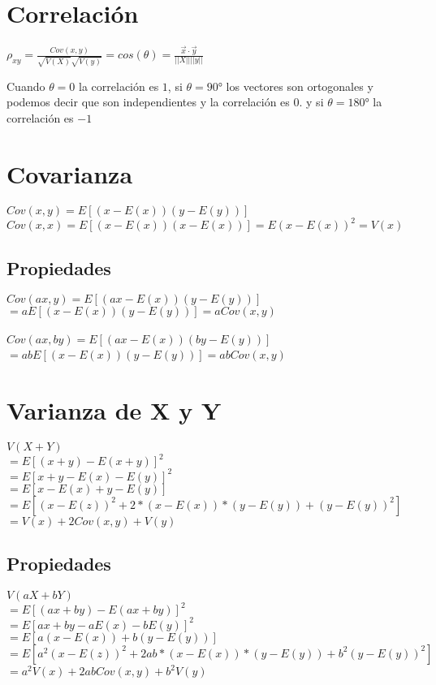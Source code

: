 \documentclass{book}
\begin{document}
\section{Correlación}

$\rho_{xy}= \frac{Cov(x,y)}{\sqrt{V(X)}\sqrt{V(y)}} = cos (\theta) = \frac{\overrightarrow{x} \cdot \overrightarrow{y}}{||X || ||y||}$

Cuando $\theta = 0$ la correlación es $1$, si $\theta=90°$ los vectores son ortogonales y podemos decir que son independientes y la correlación es $0$. y si $\theta=180°$ la correlación es $-1$

\section{Covarianza}

$Cov(x,y) = E[(x - E(x))(y-E(y))]$ \\

$Cov(x,x) = E[(x - E(x))(x-E(x))] =  E(x-E(x))^2 = V(x) $

\subsection{Propiedades}
$Cov(ax,y) = E[(ax - E(x))(y-E(y))]$ \\
$ = a E[(x - E(x))(y-E(y))] = aCov(x,y) $ \\
\\
$Cov(ax,by) = E[(ax - E(x))(by-E(y))]$ \\
$ = ab E[(x - E(x))(y-E(y))] = abCov(x,y) $ \



\section{Varianza de X y Y}

$V(X + Y)$ \\
$= E[(x+y) - E(x+y)]^2$\\
$= E[x+y-E(x)-E(y)]^2$\\
$= E[x-E(x) + y -E(y)]$\\
$= E[(x-E(z))^2 + 2*(x-E(x))*(y -E(y)) + (y -E(y))^2 ]$\\
$=  V(x) + 2Cov(x,y) + V(y)$


\subsection{Propiedades}
$V(aX + bY)$ \\
$= E[(ax+by) - E(ax+by)]^2$\\
$= E[ax+by-aE(x)-bE(y)]^2$\\
$= E[a(x-E(x)) + b(y -E(y))]$\\
$= E[a^2(x-E(z))^2 + 2ab*(x-E(x))*(y -E(y)) + b^2(y -E(y))^2 ]$\\
$=  a^2V(x) + 2abCov(x,y) + b^2V(y)$
\end{document}
